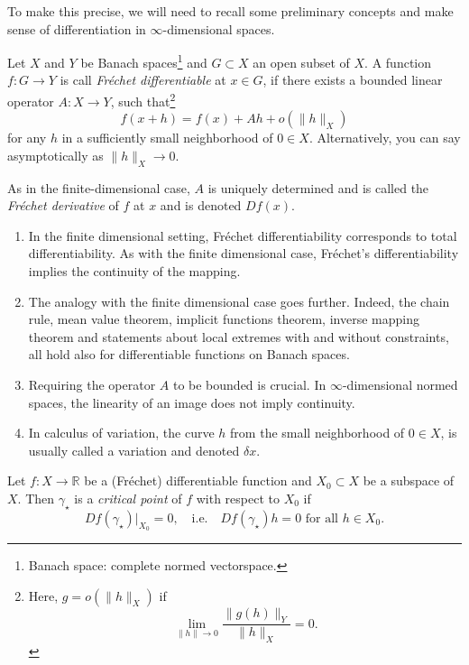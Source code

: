 \documentclass[english,fontsize=11pt,paper=a5,oneside]{scrbook}
\newcommand{\R}{\mathbb{R}}
\theoremstyle{definition}
\newenvironment{remark}
  {\pushQED{\qed}\renewcommand{\qedsymbol}{$\lozenge$}\remarkx}
  {\popQED\endremarkx}
\begin{document}
To make this precise, we will need to recall some preliminary concepts and make sense of differentiation in $\infty$-dimensional spaces.

Let $X$ and $Y$ be Banach spaces\footnote{Banach space: complete normed vectorspace.}  and $G\subset X$ an open subset of $X$.
A function $f: G \to Y$ is call \emph{Fr\'echet differentiable} at $x\in G$, if there exists a bounded linear operator $A: X \to Y$, such that\footnote{Here, $g = o(\|h\|_X)$ if 
\begin{equation}
    \lim_{\|h\| \to 0} \frac{\|g(h)\|_Y}{\|h\|_X} = 0.
\end{equation}
}
\begin{equation}\label{eq:frechetdiff}
    f(x+h) = f(x) + Ah + o(\|h\|_X)
\end{equation}
for any $h$ in a sufficiently small neighborhood of $0\in X$. Alternatively, you can say asymptotically as $\|h\|_X\to 0$.

As in the finite-dimensional case, $A$ is uniquely determined and is called the \emph{Fr\'echet derivative} of $f$ at $x$ and is denoted $D f(x)$.

\begin{remark}
    \begin{enumerate}
        \item In the finite dimensional setting, Fr\'echet differentiability corresponds to total differentiability. As with the finite dimensional case, Fr\'echet's differentiability implies the continuity of the mapping.
        \item The analogy with the finite dimensional case goes further. Indeed, the chain rule, mean value theorem, implicit functions theorem, inverse mapping theorem and statements about local extremes with and without constraints, all hold also for differentiable functions on Banach spaces.
        \item Requiring the operator $A$ to be bounded is crucial. In $\infty$-dimensional normed spaces, the linearity of an image does not imply continuity.
        \item In calculus of variation, the curve $h$ from the small neighborhood of $0\in X$, is usually called a variation and denoted $\delta x$.
    \end{enumerate}
\end{remark}

Let $f: X \to \R$ be a (Fr\'echet) differentiable function and $X_0 \subset X$ be a subspace of $X$. Then $\gamma_\star$ is a \emph{critical point} of $f$ with respect to $X_0$ if
\begin{equation}
    Df(\gamma_\star)\Big|_{X_0} = 0, \quad\mbox{i.e.}\quad
    Df(\gamma_\star)h = 0 \mbox{ for all } h\in X_0.
\end{equation}
\end{document}
